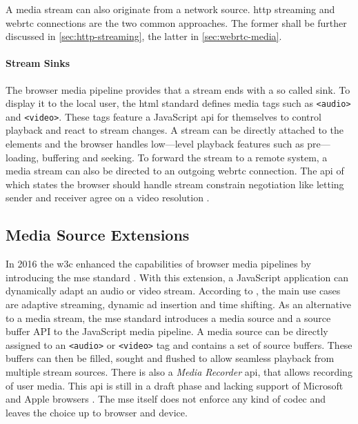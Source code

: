 A media stream can also originate from a network source. \Gls{http} streaming and \gls{webrtc} connections are the two common approaches. The former shall be further discussed in \vref{sec:http-streaming}, the latter in \vref{sec:webrtc-media}.

\paragraph{Stream Sinks}

The browser media pipeline provides that a stream ends with a so called sink. To display it to the local user, the \gls{html} standard \cite[\S4.7]{html-w3c} defines media tags such as \lstinline|<audio>| and \lstinline|<video>|. These tags feature a JavaScript \gls{api} for themselves to control playback and react to stream changes. A stream can be directly attached to the elements and the browser handles low—level playback features such as pre—loading, buffering and seeking. To forward the stream to a remote system, a media stream can also be directed to an outgoing \gls{webrtc} connection. The \gls{api} of which states the browser should handle stream constrain negotiation like letting sender and receiver agree on a video resolution \cite[\S5.1]{webrtc-w3c}.

\subsection{Media Source Extensions}\label{sec:browser-media-mse}

In 2016 the \gls{w3c} enhanced the capabilities of browser media pipelines by introducing the \gls{mse} standard \cite{media-source-extensions}. With this extension, a JavaScript application can dynamically adapt an audio or video stream. According to \cite{mse-google}, the main use cases are adaptive streaming, dynamic ad insertion and time shifting. As an alternative to a media stream, the \gls{mse} standard introduces a media source and a source buffer API to the JavaScript media pipeline. A media source can be directly assigned to an \lstinline|<audio>| or \lstinline|<video>| tag and contains a set of source buffers. These buffers can then be filled, sought and flushed to allow seamless playback from multiple stream sources. There is also a \textit{Media Recorder} \gls{api}, that allows recording of user media. This \gls{api} is still in a draft phase and lacking support of Microsoft and Apple browsers \cite{media-recorder}. The \gls{mse} itself does not enforce any kind of codec and leaves the choice up to browser and device.

